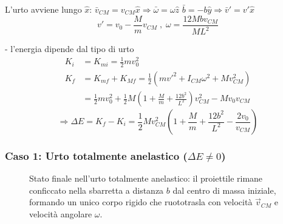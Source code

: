 L'urto avviene lungo $\hat{x}$:
$\bar{v}_{CM} = v_{CM} \hat{x} \Rightarrow \bar{\omega} = \omega \hat{z}$
$\bar{b} = -b \hat{y} \Rightarrow \bar{v}' = v' \hat{x}$
\begin{equation}
    v' = v_0 - \frac{M}{m} v_{CM} \; , \; \omega = \frac{12 M b v_{CM}}{M L^2}
\end{equation}

- l'energia dipende dal tipo di urto
\begin{align*}
K_i &= K_{mi} = \frac{1}{2} m v_0^2 \\
K_f &= K_{mf} + K_{Mf} = \frac{1}{2} (m v'^2 + I_{CM} \omega^2 + M v_{CM}^2) \\
&= \frac{1}{2} m v_0^2 + \frac{1}{2} M \left(1 + \frac{M}{m} + \frac{12 b^2}{L^2}\right) v_{CM}^2 - M v_0 v_{CM}
\end{align*}
\begin{equation}
    \Rightarrow \Delta E = K_f - K_i = \frac{1}{2} M v_{CM}^2 \left( 1 + \frac{M}{m} + \frac{12 b^2}{L^2} - \frac{2 v_0}{v_{CM}} \right)
\end{equation}

\subsubsection{Caso 1: Urto totalmente anelastico ($\Delta E \neq 0$)}
\begin{figure}[ht]
\centering
{}
\caption{Stato finale nell'urto totalmente anelastico: il proiettile rimane conficcato nella sbarretta a distanza $b$ dal centro di massa iniziale, formando un unico corpo rigido che ruototrasla con velocità $\vec{v}_{CM}$ e velocità angolare $\omega$.}
\end{figure}


